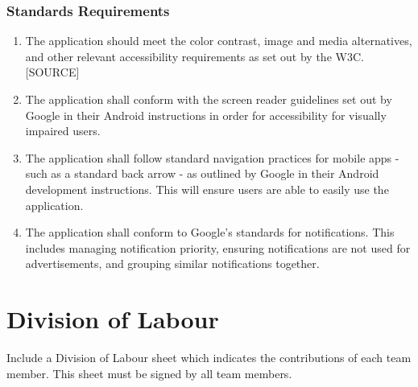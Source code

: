 \documentclass[]{article}
\begin{document}
\subsubsection{Standards Requirements}
\label{ssub:standards_requirements}
\begin{enumerate}[{LR-STD}1. ]
	\item The application should meet the color contrast, image and media alternatives, and other relevant accessibility requirements as set out by the W3C. [SOURCE]
	\item The application shall conform with the screen reader guidelines set out by Google in their Android instructions in order for accessibility for visually impaired users.
	\item The application shall follow standard navigation practices for mobile apps - such as a standard back arrow - as outlined by Google in their Android development instructions. This will ensure users are able to easily use the application.
	\item The application shall conform to Google’s standards for notifications. This includes managing notification priority, ensuring notifications are not used for advertisements, and grouping similar notifications together.
\end{enumerate}



\appendix
\section{Division of Labour}
\label{sec:division_of_labour}
Include a Division of Labour sheet which indicates the contributions of each team member. This sheet must be signed by all team members.
\end{document}
